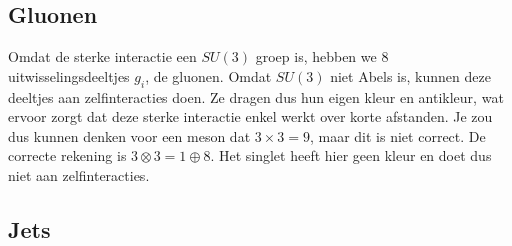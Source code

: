 \documentclass[../main.tex]{subfiles}
\begin{document}
\subsection{Gluonen}%
\label{sub:gluonen}

Omdat de sterke interactie een $SU(3)$ groep is, hebben we 8 uitwisselingsdeeltjes $g_i$, de gluonen. Omdat $SU(3)$ niet Abels is, kunnen deze deeltjes aan zelfinteracties doen. Ze dragen dus hun eigen kleur en antikleur, wat ervoor zorgt dat deze sterke interactie enkel werkt over korte afstanden. Je zou dus kunnen denken voor een meson dat $3\times 3 = 9$, maar dit is niet correct. De correcte rekening is $3\otimes 3 = 1 \oplus 8$. Het singlet heeft hier geen kleur en doet dus niet aan zelfinteracties.

\subsection{Jets}%
\label{sub:jets}
\end{document}
